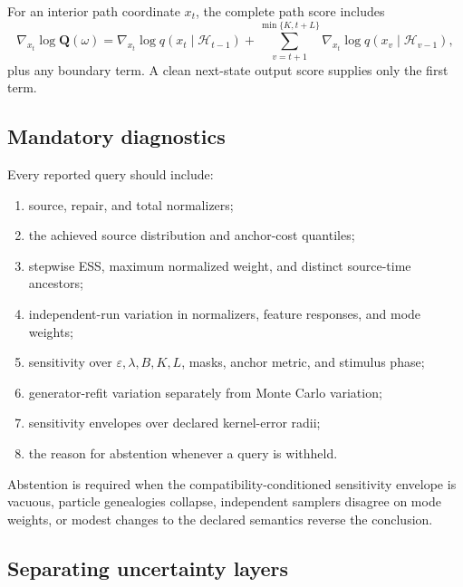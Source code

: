 \documentclass{article}
\newcommand{\Hist}{\mathcal H}
\newcommand{\PathQ}{\mathbf Q}
\newcommand{\eps}{\varepsilon}
\theoremstyle{remark}
\begin{document}
For an interior path coordinate \(x_t\), the complete path score includes
\begin{equation}
  \nabla_{x_t}\log\PathQ(\omega)
  =
  \nabla_{x_t}\log q(x_t\mid\Hist_{t-1})
  +
  \sum_{v=t+1}^{\min\{K,t+L\}}
  \nabla_{x_t}\log q(x_v\mid\Hist_{v-1}),
  \label{eq:path-score-app}
\end{equation}
plus any boundary term. A clean next-state output score supplies only the
first term.

\subsection{Mandatory diagnostics}

Every reported query should include:
\begin{enumerate}[leftmargin=1.5em]
  \item source, repair, and total normalizers;
  \item the achieved source distribution and anchor-cost quantiles;
  \item stepwise ESS, maximum normalized weight, and distinct source-time
  ancestors;
  \item independent-run variation in normalizers, feature responses, and mode
  weights;
  \item sensitivity over \(\eps,\lambda,B,K,L\), masks, anchor metric, and
  stimulus phase;
  \item generator-refit variation separately from Monte Carlo variation;
  \item sensitivity envelopes over declared kernel-error radii;
  \item the reason for abstention whenever a query is withheld.
\end{enumerate}

Abstention is required when the compatibility-conditioned sensitivity envelope
is vacuous, particle genealogies collapse, independent samplers disagree on
mode weights, or modest changes to the declared semantics reverse the
conclusion.

\subsection{Separating uncertainty layers}
\end{document}
